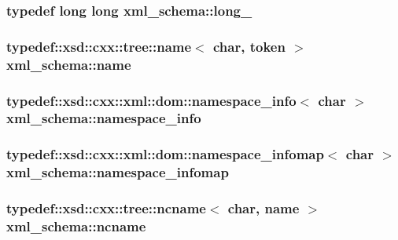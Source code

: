 \subsubsection[{\texorpdfstring{long\+\_\+}{long_}}]{\setlength{\rightskip}{0pt plus 5cm}typedef long long {\bf xml\+\_\+schema\+::long\+\_\+}}\hypertarget{namespacexml__schema_a1d78aacee49e26cb7a69d5aa97df1268}{}\label{namespacexml__schema_a1d78aacee49e26cb7a69d5aa97df1268}
\subsubsection[{\texorpdfstring{name}{name}}]{\setlength{\rightskip}{0pt plus 5cm}typedef\+::xsd\+::cxx\+::tree\+::name$<$ char, {\bf token} $>$ {\bf xml\+\_\+schema\+::name}}\hypertarget{namespacexml__schema_a2f1617231643eded4c3b9aa5f1ed6c08}{}\label{namespacexml__schema_a2f1617231643eded4c3b9aa5f1ed6c08}
\subsubsection[{\texorpdfstring{namespace\+\_\+info}{namespace_info}}]{\setlength{\rightskip}{0pt plus 5cm}typedef\+::xsd\+::cxx\+::xml\+::dom\+::namespace\+\_\+info$<$ char $>$ {\bf xml\+\_\+schema\+::namespace\+\_\+info}}\hypertarget{namespacexml__schema_a3bd77dc3d8c54be1c5369ce1aa8abebf}{}\label{namespacexml__schema_a3bd77dc3d8c54be1c5369ce1aa8abebf}
\subsubsection[{\texorpdfstring{namespace\+\_\+infomap}{namespace_infomap}}]{\setlength{\rightskip}{0pt plus 5cm}typedef\+::xsd\+::cxx\+::xml\+::dom\+::namespace\+\_\+infomap$<$ char $>$ {\bf xml\+\_\+schema\+::namespace\+\_\+infomap}}\hypertarget{namespacexml__schema_a17712c8260e03226f0a9e4d21ab78f42}{}\label{namespacexml__schema_a17712c8260e03226f0a9e4d21ab78f42}
\subsubsection[{\texorpdfstring{ncname}{ncname}}]{\setlength{\rightskip}{0pt plus 5cm}typedef\+::xsd\+::cxx\+::tree\+::ncname$<$ char, {\bf name} $>$ {\bf xml\+\_\+schema\+::ncname}}\hypertarget{namespacexml__schema_adb64d7469eb27804ae649fbaccba54d6}{}\label{namespacexml__schema_adb64d7469eb27804ae649fbaccba54d6}
